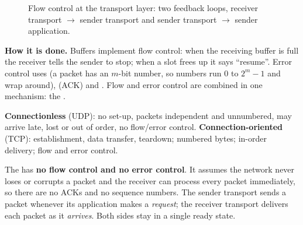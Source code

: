 \begin{figure}[H]\centering
{}
\caption{Flow control at the transport layer: two feedback loops, receiver transport $\to$ sender transport and sender transport $\to$ sender application. }
\end{figure}

\textbf{How it is done.} Buffers implement flow control: when the receiving buffer is full the receiver tells the sender to stop; when
a slot frees up it says ``resume''. Error control uses  (a packet has an $m$-bit number, so numbers run $0$ to $2^m-1$
and wrap around),  (ACK) and . Flow and error control are combined in one mechanism: the .



\textbf{Connectionless} (UDP): no set-up, packets independent and unnumbered, may arrive late, lost or out of order, no flow/error control.
\textbf{Connection-oriented} (TCP): establishment, data transfer, teardown; numbered bytes; in-order delivery; flow and error control.

\begin{keyconceptbox}
The  has \textbf{no flow control and no error control}. It assumes the network never loses or corrupts a packet
and the receiver can process every packet immediately, so there are no ACKs and no sequence numbers. The sender transport sends a packet
whenever its application makes a \emph{request}; the receiver transport delivers each packet as it \emph{arrives}. Both sides stay in a single
\textsf{ready} state. 
\end{keyconceptbox}

